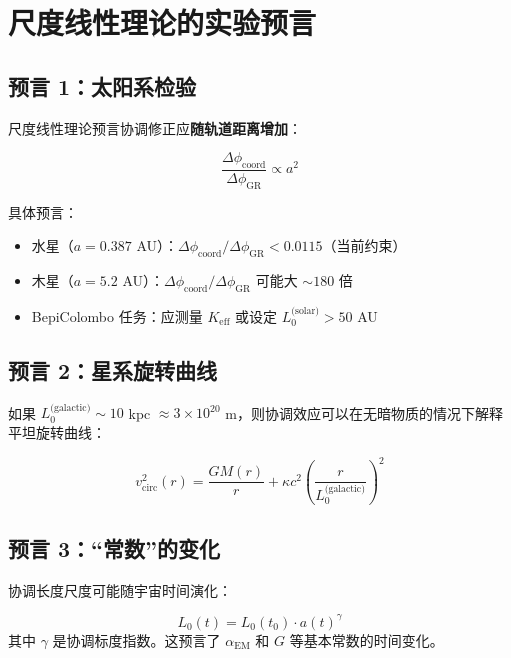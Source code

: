 \documentclass[11pt,a4paper]{article}
\begin{document}
	\section{尺度线性理论的实验预言}
	\label{sec:scale-predictions}
	
	\subsection{预言 1：太阳系检验}
	
	尺度线性理论预言协调修正应\textbf{随轨道距离增加}：
	
	\begin{equation}
		\frac{\Delta\phi_{\text{coord}}}{\Delta\phi_{\text{GR}}} \propto a^2
	\end{equation}
	
	具体预言：
	\begin{itemize}
		\item 水星（$a = 0.387$ AU）：$\Delta\phi_{\text{coord}}/\Delta\phi_{\text{GR}} < 0.0115$（当前约束）
		\item 木星（$a = 5.2$ AU）：$\Delta\phi_{\text{coord}}/\Delta\phi_{\text{GR}}$ 可能大 $\sim 180$ 倍
		\item BepiColombo 任务：应测量 $K_{\mathrm{eff}}$ 或设定 $L_0^{\text{(solar)}} > 50$ AU
	\end{itemize}
	
	\subsection{预言 2：星系旋转曲线}
	
	如果 $L_0^{\text{(galactic)}} \sim 10$ kpc $\approx 3\times10^{20}$ m，则协调效应可以在无暗物质的情况下解释平坦旋转曲线：
	
	\begin{equation}
		v_{\text{circ}}^2(r) = \frac{GM(r)}{r} + \kappa c^2 \left(\frac{r}{L_0^{\text{(galactic)}}}\right)^2
	\end{equation}
	
	\subsection{预言 3：“常数”的变化}
	
	协调长度尺度可能随宇宙时间演化：
	
	\begin{equation}
		L_0(t) = L_0(t_0) \cdot a(t)^\gamma
	\end{equation}
	其中 $\gamma$ 是协调标度指数。这预言了 $\alpha_{\text{EM}}$ 和 $G$ 等基本常数的时间变化。
	
\end{document}
